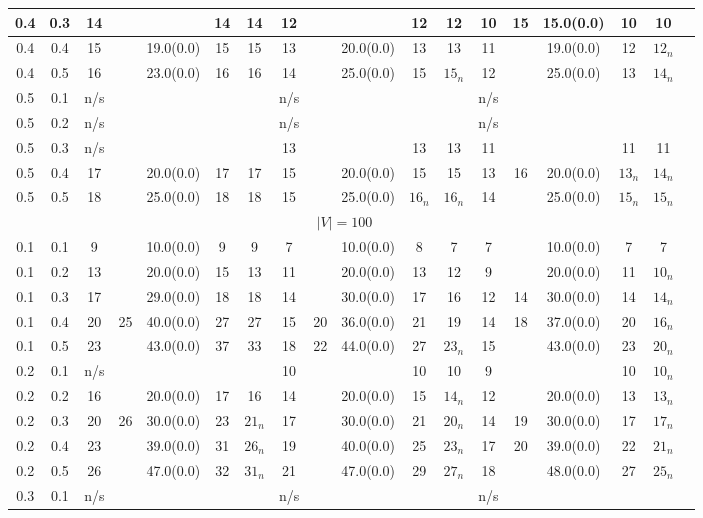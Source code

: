 \documentclass[10pt]{article}
\begin{document}
\begin{table}
\begin{tabular}{|c|c|c|c|c|c|c||c|c|c|c|c||c|c|c|c|c|c|}
	\hline
	0.4&0.3&14&  &  & 14& 14 & 12 &  &  & 12 & 12 & 10&15&15.0(0.0)&10&10\\ 
	\hline
	0.4&0.4&15&  & 19.0(0.0) & 15& 15 & 13 &  & 20.0(0.0)& 13 & 13 & 11&&19.0(0.0)&12&$12_n$\\ 
	\hline
	0.4&0.5&16&  & 23.0(0.0) & 16& 16 & 14 &  & 25.0(0.0) & 15 & $15_n$ &12&&25.0(0.0)&13&$14_n$\\ 
	\hline
	0.5&0.1&n/s&  &  & &  & n/s &  &  &  &  & n/s&&&&\\ 
	\hline
	0.5&0.2&n/s&  &  & &  & n/s &  &  &  &  & n/s&&&&\\ 
	\hline
	0.5&0.3&n/s&  &  & &  & 13 &  &  & 13 & 13 &11&&&11&11\\ 
	\hline
	0.5&0.4&17&  & 20.0(0.0) & 17& 17 & 15 &  &20.0(0.0)& 15 & 15 & 13&16&20.0(0.0)&$13_n$&$14_n$\\ 
	\hline
	0.5&0.5&18&  & 25.0(0.0) & 18& 18 & 15 &  & 25.0(0.0) & $16_n$ & $16_n$ & 14&&25.0(0.0)&$15_n$&$15_n$\\ 
	\hline
	  	\multicolumn{17}{|c|}{$|V| = 100$} \\
  	\hline
	0.1&0.1&9&&10.0(0.0) & 9& 9 & 7& & 10.0(0.0) & 8 & 7 & 7 &&10.0(0.0)&7&7\\ 
	\hline
	0.1&0.2&13&  & 20.0(0.0) & 15& 13 & 11 &  & 20.0(0.0) & 13 & 12 & 9&&20.0(0.0)&11&$10_n$\\ 
	\hline
	0.1&0.3&17&  & 29.0(0.0) & 18& 18 & 14&  & 30.0(0.0) & 17 & 16 & 12&14&30.0(0.0)&14&$14_n$\\ 
	\hline
	0.1&0.4&20&25 & 40.0(0.0) & 27& 27 &15 & 20 & 36.0(0.0) & 21 & 19 & 14&18&37.0(0.0)&20&$16_n$\\ 
	\hline
	0.1&0.5&23& & 43.0(0.0) & 37& 33 &18& 22 & 44.0(0.0) & 27 & $23_n$ & 15&&43.0(0.0)&23&$20_n$\\ 
	\hline
	0.2&0.1&n/s&  & & & &10&  &  & 10 & 10 & 9&&&10&$10_n$\\ 
	\hline
	0.2&0.2&16&  & 20.0(0.0) & 17& 16 &14 &  & 20.0(0.0) & 15 & $14_n$ & 12&&20.0(0.0)&13&$13_n$\\ 
	\hline
	0.2&0.3&20& 26 & 30.0(0.0) & 23& $21_n$ &17 &  &30.0(0.0)& 21 & $20_n$ & 14&19&30.0(0.0)&17&$17_n$\\ 
	\hline
	0.2&0.4&23&  & 39.0(0.0) & 31& $26_n$ & 19 &  & 40.0(0.0) & 25 & $23_n$ & 17&20&39.0(0.0)&22&$21_n$\\ 
	\hline
	0.2&0.5&26&  & 47.0(0.0) & 32& $31_n$ & 21&  & 47.0(0.0) & 29 & $27_n$ & 18&&48.0(0.0)&27&$25_n$\\ 
	\hline
	0.3&0.1&n/s&  & & &  & n/s&  &  &  &  & n/s &&& & \\ 

\end{tabular}
\end{table}
\end{document}
